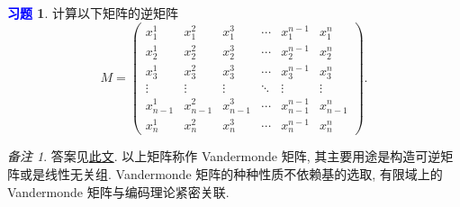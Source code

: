\documentclass[11pt]{ctexart}
\theoremstyle{definition}
\numberwithin{equation}{section}
\theoremstyle{definition}
\newtheorem{exercise}{\textcolor{blue}{习题}}
\theoremstyle{remark}
\newtheorem*{remark}{备注}
\begin{document}
\begin{exercise}
    计算以下矩阵的逆矩阵
    \begin{equation}
        M=\begin{pmatrix}
            x_{1}^{1} & x_{1}^{2} & x_{1}^{3} & \cdots  & x_{1}^{n-1} & x_{1}^{n}\\
            x_{2}^{1} & x_{2}^{2} & x_{2}^{3} & \cdots  & x_{2}^{n-1} & x_{2}^{n}\\
            x_{3}^{1} & x_{3}^{2} & x_{3}^{3} & \cdots  & x_{3}^{n-1} & x_{3}^{n}\\
            \vdots  & \vdots  & \vdots  & \ddots  & \vdots  & \vdots \\
            x_{n-1}^{1} & x_{n-1}^{2} & x_{n-1}^{3} & \cdots  & x_{n-1}^{n-1} & x_{n-1}^{n}\\
            x_{n}^{1} & x_{n}^{2} & x_{n}^{3} & \cdots  & x_{n}^{n-1} & x_{n}^{n}
            \end{pmatrix}.
    \end{equation}
\end{exercise}

\begin{remark}
    答案见\href{http://proofwiki.org/wiki/Inverse_of_Vandermonde_Matrix}{此文}. 以上矩阵称作 Vandermonde 矩阵, 其主要用途是构造可逆矩阵或是线性无关组. Vandermonde 矩阵的种种性质不依赖基的选取, 有限域上的 Vandermonde 矩阵与编码理论紧密关联. 
\end{remark}
\end{document}
